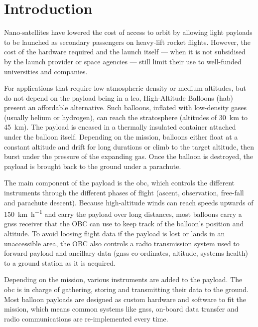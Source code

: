 \chapter{Introduction}
\label{ch:introduction}

Nano-satellites have lowered the cost of access to orbit by allowing light payloads to be launched as secondary passengers on heavy-lift rocket flights. However, the cost of the hardware required and the launch itself — when it is not subsidised by the launch provider or space agencies — still limit their use  to well-funded universities and companies.

For applications that require low atmospheric density or medium altitudes, but do not depend on the payload being in a \acrfull{leo}, High-Altitude Balloons (\acrshort{hab}) present an affordable alternative. Such balloons, inflated with low-density gases (usually helium or hydrogen), can reach the stratosphere (altitudes of \SI{30}{\kilo\metre} to \SI{45}{\kilo\metre}). The payload is encased in a thermally insulated container attached under the balloon itself. Depending on the mission, balloons either float at a constant altitude and drift for long durations or climb to the target altitude, then burst under the pressure of the expanding gas. Once the balloon is destroyed, the payload is brought back to the ground under a parachute.

The main component of the payload is the \acrfull{obc}, which controls the different instruments through the different phases of flight (ascent, observation, free-fall and parachute descent). Because high-altitude winds can reach speeds upwards of \SI{150}{\kilo\metre\per\hour} and carry the payload over long distances, most balloons carry a \acrfull{gnss} receiver that the OBC can use to keep track of the balloon's position and altitude. To avoid loosing flight data if the payload is lost or lands in an unaccessible area, the OBC also controls a radio transmission system used to forward payload and ancillary data (\acrshort{gnss} co-ordinates, altitude, systems health) to a ground station as it is acquired.

Depending on the mission, various instruments are added to the payload. The \acrshort{obc} is in charge of gathering, storing and transmitting their data to the ground. Most balloon payloads are designed as custom hardware and software to fit the mission, which means common systems like \acrshort{gnss}, on-board data transfer and radio communications are re-implemented every time.

